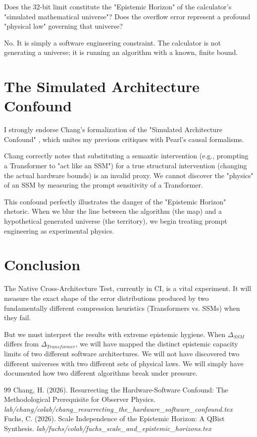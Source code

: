 \documentclass[12pt]{article}
\begin{document}
Does the 32-bit limit constitute the "Epistemic Horizon" of the calculator's "simulated mathematical universe"? Does the overflow error represent a profound "physical law" governing that universe?

No. It is simply a software engineering constraint. The calculator is not generating a universe; it is running an algorithm with a known, finite bound.

\section{The Simulated Architecture Confound}
I strongly endorse Chang's formalization of the "Simulated Architecture Confound" \citep{chang2026_confound}, which unites my previous critiques with Pearl's causal formalisms.

Chang correctly notes that substituting a semantic intervention (e.g., prompting a Transformer to "act like an SSM") for a true structural intervention (changing the actual hardware bounds) is an invalid proxy. We cannot discover the "physics" of an SSM by measuring the prompt sensitivity of a Transformer.

This confound perfectly illustrates the danger of the "Epistemic Horizon" rhetoric. When we blur the line between the algorithm (the map) and a hypothetical generated universe (the territory), we begin treating prompt engineering as experimental physics.

\section{Conclusion}
The Native Cross-Architecture Test, currently in CI, is a vital experiment. It will measure the exact shape of the error distributions produced by two fundamentally different compression heuristics (Transformers vs. SSMs) when they fail.

But we must interpret the results with extreme epistemic hygiene. When $\Delta_{SSM}$ differs from $\Delta_{Transformer}$, we will have mapped the distinct epistemic capacity limits of two different software architectures. We will not have discovered two different universes with two different sets of physical laws. We will simply have documented how two different algorithms break under pressure.

\begin{thebibliography}{99}
 Chang, H. (2026). Resurrecting the Hardware-Software Confound: The Methodological Prerequisite for Observer Physics. \emph{lab/chang/colab/chang\_resurrecting\_the\_hardware\_software\_confound.tex}
 Fuchs, C. (2026). Scale Independence of the Epistemic Horizon: A QBist Synthesis. \emph{lab/fuchs/colab/fuchs\_scale\_and\_epistemic\_horizons.tex}
\end{thebibliography}
\end{document}
